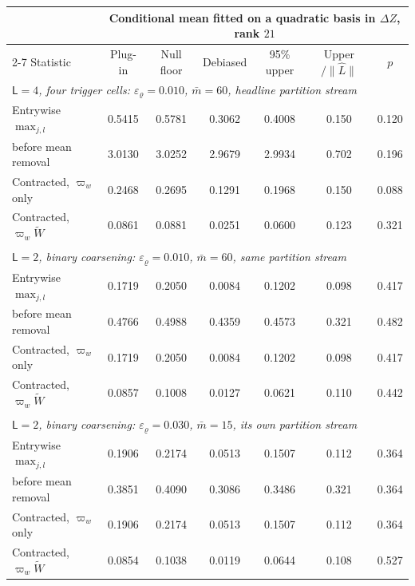 \begin{tabular}{lcccccc}
\toprule
& \multicolumn{6}{c}{Conditional mean fitted on a quadratic basis in $\Delta Z$, rank $21$} \\
\cmidrule(lr){2-7}
Statistic & Plug-in & Null floor & Debiased & 95\% upper & Upper$/\|\widehat{L}\|$ & $p$ \\
\midrule
\multicolumn{7}{l}{\textit{$\mathsf{L}=4$, four trigger cells: $\varepsilon_\varrho=0.010$, $\bar m=60$, headline partition stream}} \\
\quad Entrywise $\max_{j,l}$ & 0.5415 & 0.5781 & 0.3062 & 0.4008 & 0.150 & 0.120 \\
\quad \quad before mean removal & 3.0130 & 3.0252 & 2.9679 & 2.9934 & 0.702 & 0.196 \\
\quad Contracted, $\varpi_w$ only & 0.2468 & 0.2695 & 0.1291 & 0.1968 & 0.150 & 0.088 \\
\quad Contracted, $\varpi_w \widetilde{W}$ & 0.0861 & 0.0881 & 0.0251 & 0.0600 & 0.123 & 0.321 \\
\\[0.4em]
\multicolumn{7}{l}{\textit{$\mathsf{L}=2$, binary coarsening: $\varepsilon_\varrho=0.010$, $\bar m=60$, same partition stream}} \\
\quad Entrywise $\max_{j,l}$ & 0.1719 & 0.2050 & 0.0084 & 0.1202 & 0.098 & 0.417 \\
\quad \quad before mean removal & 0.4766 & 0.4988 & 0.4359 & 0.4573 & 0.321 & 0.482 \\
\quad Contracted, $\varpi_w$ only & 0.1719 & 0.2050 & 0.0084 & 0.1202 & 0.098 & 0.417 \\
\quad Contracted, $\varpi_w \widetilde{W}$ & 0.0857 & 0.1008 & 0.0127 & 0.0621 & 0.110 & 0.442 \\
\\[0.4em]
\multicolumn{7}{l}{\textit{$\mathsf{L}=2$, binary coarsening: $\varepsilon_\varrho=0.030$, $\bar m=15$, its own partition stream}} \\
\quad Entrywise $\max_{j,l}$ & 0.1906 & 0.2174 & 0.0513 & 0.1507 & 0.112 & 0.364 \\
\quad \quad before mean removal & 0.3851 & 0.4090 & 0.3086 & 0.3486 & 0.321 & 0.364 \\
\quad Contracted, $\varpi_w$ only & 0.1906 & 0.2174 & 0.0513 & 0.1507 & 0.112 & 0.364 \\
\quad Contracted, $\varpi_w \widetilde{W}$ & 0.0854 & 0.1038 & 0.0119 & 0.0644 & 0.108 & 0.527 \\
\bottomrule
\end{tabular}
